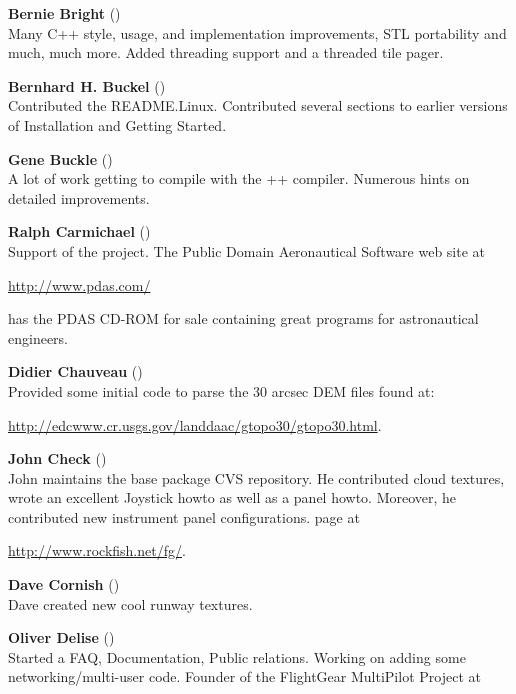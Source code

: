 \noindent \textbf{Bernie Bright}
()\\
  Many C++ style, usage, and implementation improvements, STL
  portability and much, much more.
  Added threading support and a threaded tile pager.
 \medskip

\noindent \textbf{Bernhard H. Buckel}
()\\
  Contributed the README.Linux.  Contributed several sections to earlier versions of
 Installation and Getting Started.
 \medskip

\noindent \textbf{Gene Buckle} ()\\
  A lot of work getting \FlightGear{} to compile with the ++
  compiler. Numerous hints on detailed improvements.
 \medskip


\noindent \textbf{Ralph Carmichael} ()\\
  Support of the project. The Public Domain Aeronautical Software web site at
\medskip

\href{http://www.pdas.com/}{http://www.pdas.com/}
 \medskip

 \noindent
 has the PDAS CD-ROM for sale containing great programs for astronautical engineers.

\noindent \textbf{Didier Chauveau}
()\\
  Provided some initial code to parse the 30 arcsec DEM files found at:
   \medskip

  \href{http://edcwww.cr.usgs.gov/landdaac/gtopo30/gtopo30.html}{http://edcwww.cr.usgs.gov/landdaac/gtopo30/gtopo30.html}.
 \medskip

\noindent \textbf{John Check} ()\\
 John maintains the base package CVS repository. He contributed cloud textures, wrote an excellent Joystick howto as well as a panel
 howto. Moreover, he contributed new instrument panel configurations. \FlightGear{}
 page at
 \medskip

 \href{http://www.rockfish.net/fg/}{http://www.rockfish.net/fg/}.
 \medskip

\noindent \textbf{Dave Cornish} ()\\
 Dave created new cool runway textures.
 \medskip

\noindent \textbf{Oliver Delise}  ()\\
 Started a FAQ, Documentation, Public relations. Working on adding some
  networking/multi-user code. Founder of the FlightGear MultiPilot
  Project at
   \medskip

